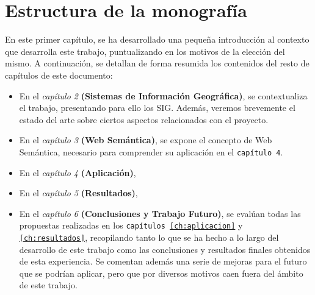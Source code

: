 \section{Estructura de la monografía}


En este primer capítulo, se ha desarrollado una pequeña introducción al contexto que desarrolla este trabajo, puntualizando en los motivos de la elección del mismo. A continuación, se detallan de forma resumida los contenidos del resto de capítulos de este documento:

\begin{itemize}
	\item En el \textit{capítulo 2} \textbf{(Sistemas de Información Geográfica)}, se contextualiza el trabajo, presentando para ello los SIG. Además, veremos brevemente el estado del arte sobre ciertos aspectos relacionados con el proyecto.
	
	\item En el \textit{capítulo 3} \textbf{(Web Semántica)}, se expone el concepto de Web Semántica, necesario para comprender su aplicación en el \texttt{capítulo 4}.
	
	\item En el \textit{capítulo 4} \textbf{(Aplicación)}, 
	
	\item En el \textit{capítulo 5} \textbf{(Resultados)}, 

	\item En el \textit{capítulo 6} \textbf{(Conclusiones y Trabajo Futuro)}, se evalúan todas las propuestas realizadas en los \texttt{capítulos \ref{ch:aplicacion}} y \texttt{\ref{ch:resultados}}, recopilando tanto lo que se ha hecho a lo largo del desarrollo de este trabajo como las conclusiones y resultados finales obtenidos de esta experiencia. Se comentan además una serie de mejoras para el futuro que se podrían aplicar, pero que por diversos motivos caen fuera del ámbito de este trabajo.
	
	
\end{itemize}


